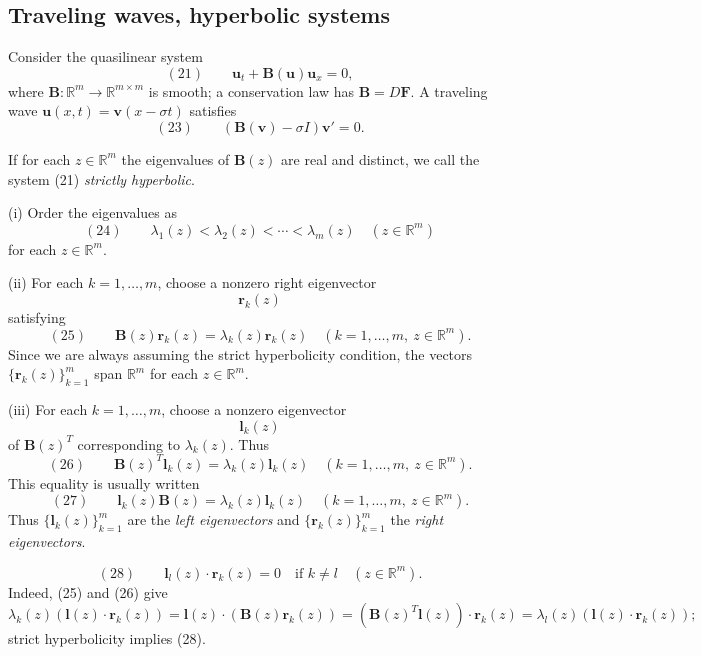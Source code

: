\subsection{Traveling waves, hyperbolic systems}\label{sec:traveling-waves-hyperbolic-systems}

Consider the quasilinear system
\[
(21)\qquad \mathbf u_t+\mathbf B(\mathbf u)\mathbf u_x=0,
\]
where $\mathbf B:\mathbb R^m\to\mathbb R^{m\times m}$ is smooth; a conservation law has $\mathbf B=D\mathbf F$. A traveling wave $\mathbf u(x,t)=\mathbf v(x-\sigma t)$ satisfies
\[
(23)\qquad (\mathbf B(\mathbf v)-\sigma I)\mathbf v'=0.
\]

\begin{definition}
\label{def:strictly-hyperbolic-system}
If for each $z\in\mathbb{R}^m$ the eigenvalues of $\mathbf{B}(z)$ are real and distinct, we call the system (21) \textit{strictly hyperbolic}.
\end{definition}

\begin{definition}
\label{def:eigenvalue-eigenvector-notation-hyperbolic}
(i) Order the eigenvalues as
$$(24) \qquad \lambda_1(z) < \lambda_2(z) < \cdots < \lambda_m(z) \quad (z\in\mathbb{R}^m)$$
for each $z\in\mathbb R^m$.

(ii) For each $k=1,\ldots,m$, choose a nonzero right eigenvector
$$\mathbf{r}_k(z)$$
satisfying
$$(25) \qquad \mathbf{B}(z)\mathbf{r}_k(z) = \lambda_k(z)\mathbf{r}_k(z) \quad (k=1,\ldots,m,\ z\in\mathbb{R}^m).$$
Since we are always assuming the strict hyperbolicity condition, the vectors $\{\mathbf{r}_k(z)\}_{k=1}^m$ span $\mathbb{R}^m$ for each $z\in\mathbb{R}^m$.

(iii) For each $k=1,\ldots,m$, choose a nonzero eigenvector
$$\mathbf{l}_k(z)$$
of $\mathbf B(z)^T$ corresponding to $\lambda_k(z)$. Thus
$$(26) \qquad \mathbf{B}(z)^T\mathbf{l}_k(z) = \lambda_k(z)\mathbf{l}_k(z) \quad (k=1,\ldots,m,\ z\in\mathbb{R}^m).$$
This equality is usually written
$$(27) \qquad \mathbf{l}_k(z)\mathbf{B}(z) = \lambda_k(z)\mathbf{l}_k(z) \quad (k=1,\ldots,m,\ z\in\mathbb{R}^m).$$
Thus $\{\mathbf{l}_k(z)\}_{k=1}^m$ are the \textit{left eigenvectors} and $\{\mathbf{r}_k(z)\}_{k=1}^m$ the \textit{right eigenvectors}.
\end{definition}

\begin{remark}
\label{rem:eigenvector-orthogonality}
$$(28) \qquad \mathbf{l}_l(z)\cdot\mathbf{r}_k(z) = 0 \quad \text{if } k\neq l \quad (z\in\mathbb{R}^m).$$
Indeed, (25) and (26) give
$$\lambda_k(z)(\mathbf{l}(z)\cdot\mathbf{r}_k(z)) = \mathbf{l}(z)\cdot(\mathbf{B}(z)\mathbf{r}_k(z)) = (\mathbf{B}(z)^T\mathbf{l}(z))\cdot\mathbf{r}_k(z) = \lambda_l(z)(\mathbf{l}(z)\cdot\mathbf{r}_k(z));$$
strict hyperbolicity implies (28).
\end{remark}

